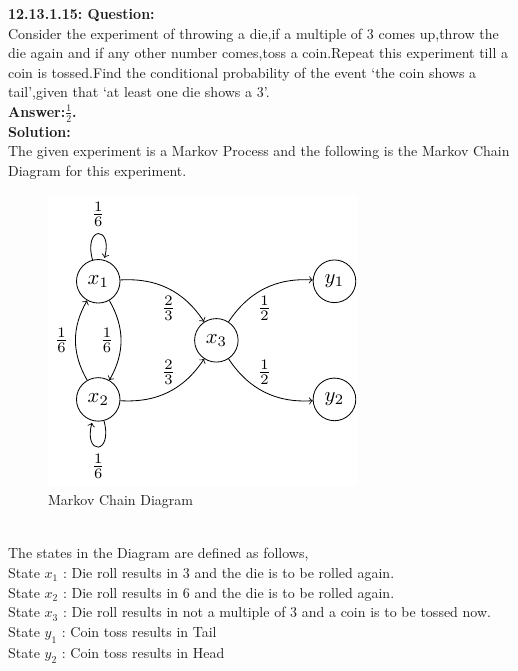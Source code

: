 \documentclass[journal,12pt,twocolumn]{IEEEtran}
\begin{document}
\textbf{12.13.1.15: Question:}\\
 	Consider the experiment of throwing a die,if a multiple of 3 comes up,throw the die again and if any other number comes,toss a coin.Repeat this experiment till a coin is tossed.Find the conditional probability of the event `the coin shows a tail',given that `at least one die shows a 3'.
 \\\textbf{Answer:$\frac{1}{2}$.}
 \\\textbf{Solution:}
 \\
 The given experiment is a Markov Process and the following is the Markov Chain Diagram for this experiment.
 \begin{figure}[h]
\centering
\includegraphics[width=\columnwidth]{./Figure/figure.pdf}
\caption { Markov Chain Diagram }
\end{figure}
\\The states in the Diagram are defined as follows,
\\State $x_1$ : Die roll results in 3 and the die is to be rolled again.
\\State $x_2$ : Die roll results in 6 and the die is to be rolled again.
\\State $x_3$ : Die roll results in not a multiple of 3 and a coin is to be tossed now.
\\State $y_1$ : Coin toss results in Tail
\\State $y_2$ : Coin toss results in Head
\end{document}
